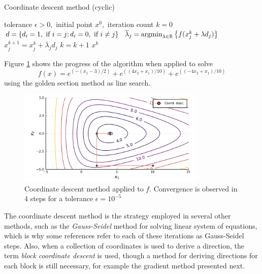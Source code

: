 \begin{algorithm}[H]
\caption{Coordinate descent method (cyclic)} \label{Alg5}
\begin{algorithmic}[1] %
 tolerance $\epsilon > 0,$ initial point $x^0,$ iteration count $k = 0$ 
     \label{alg5:line3}
        \State $d =\left\{ d_i = 1, \text{ if } i=j; d_i = 0, \text{ if } i \neq j \right \}$
        \State $\overline{\lambda}_j = \mathop{\rm argmin}_{\lambda \in \mathbb{R}}\left\{ f(x_j^k + \lambda d_j) \right \}$
        \State $x^{k+1}_j = x^k_j + \overline{\lambda}_j  d_j$
    \EndFor
    \State $k = k+1$
\EndWhile
{} $x^k$
\end{algorithmic}
\end{algorithm}

Figure \ref{fig:coordinate_descent} shows the progress of the algorithm when applied to solve 
$$f(x)=e^{(-(x_1-3)/2)} + e^{((4x_2 + x_1)/10)} + e^{((-4x_2 + x_1)/10)}$$ using the golden section method as line search. 

\begin{figure}[H]
\includegraphics[width=0.8\textwidth]{part_2/chapter_5/figures/coordinate_decent_exact.pdf}	
\caption{Coordinate descent method applied to $f$. Convergence is observed in 4 steps for a tolerance $\epsilon = 10^{-5}$} \label{fig:coordinate_descent}
\end{figure}

The coordinate descent method is the strategy employed in several other methods, such as the \emph{Gauss-Seidel} method for solving linear system of equations, which is why some references refer to each of these iterations as Gauss-Seidel steps. Also, when a collection of coordinates is used to derive a direction, the term \emph{block coordinate descent} is used, though a method for deriving directions for each block is still necessary, for example the gradient method presented next.  


